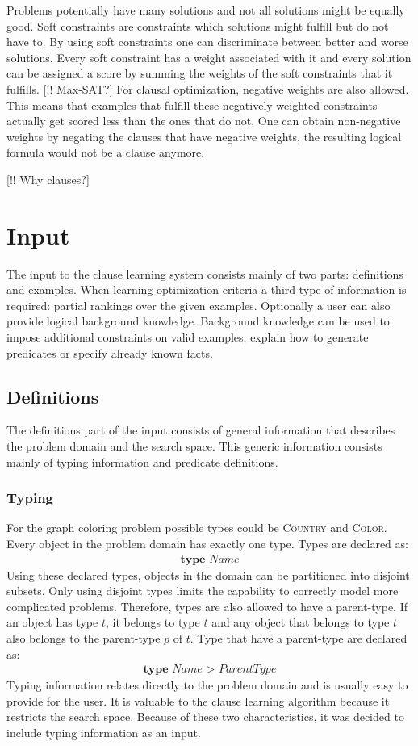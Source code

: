 Problems potentially have many solutions and not all solutions might be equally good. Soft constraints are constraints which solutions might fulfill but do not have to. By using soft constraints one can discriminate between better and worse solutions. Every soft constraint has a weight associated with it and every solution can be assigned a score by summing the weights of the soft constraints that it fulfills. [!! Max-SAT?] For clausal optimization, negative weights are also allowed. This means that examples that fulfill these negatively weighted constraints actually get scored less than the ones that do not. One can obtain non-negative weights by negating the clauses that have negative weights, the resulting logical formula would not be a clause anymore.

[!! Why clauses?]

\section{Input}
The input to the clause learning system consists mainly of two parts: definitions and examples. When learning optimization criteria a third type of information is required: partial rankings over the given examples. Optionally a user can also provide logical background knowledge. Background knowledge can be used to impose additional constraints on valid examples, explain how to generate predicates or specify already known facts.

\subsection{Definitions}
The definitions part of the input consists of general information that describes the problem domain and the search space. This generic information consists mainly of typing information and predicate definitions.

\subsubsection{Typing}
For the graph coloring problem possible types could be \textsc{Country} and \textsc{Color}. Every object in the problem domain has exactly one type. Types are declared as:
\begin{align*}
\textbf{type } Name
\end{align*}
Using these declared types, objects in the domain can be partitioned into disjoint subsets. Only using disjoint types limits the capability to correctly model more complicated problems. Therefore, types are also allowed to have a parent-type. If an object has type $t$, it belongs to type $t$ and any object that belongs to type $t$ also belongs to the parent-type $p$ of $t$. Type that have a parent-type are declared as:
\begin{align*}
\textbf{type } Name \textbf{ > } ParentType
\end{align*}
Typing information relates directly to the problem domain and is usually easy to provide for the user. It is valuable to the clause learning algorithm because it restricts the search space. Because of these two characteristics, it was decided to include typing information as an input.

